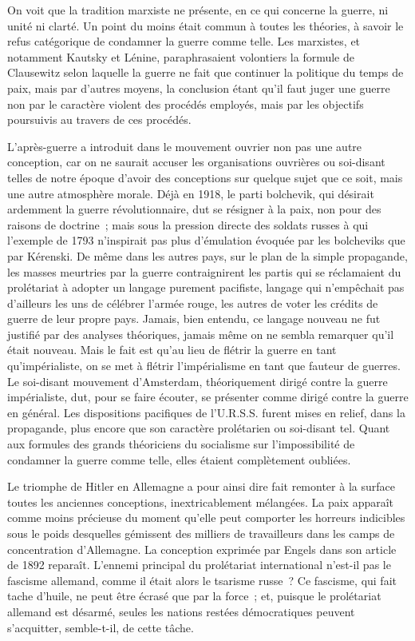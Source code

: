 \documentclass[french,twoside]{book} %
\begin{document}
On voit que la tradition marxiste ne présente, en ce qui concerne la guerre, ni unité ni clarté. Un point du moins était commun à toutes les théories, à savoir le refus catégorique de condamner la guerre comme telle. Les marxis­tes, et notamment Kautsky et Lénine, paraphrasaient volontiers la formule de Clausewitz selon laquelle la guerre ne fait que continuer la politique du temps de paix, mais par d'autres moyens, la conclusion étant qu'il faut juger une guerre non par le caractère violent des procédés employés, mais par les objectifs poursuivis au travers de ces procédés.\par
L'après-guerre a introduit dans le mouvement ouvrier non pas une autre conception, car on ne saurait accuser les organisations ouvrières ou soi-disant telles de notre époque d'avoir des conceptions sur quelque sujet que ce soit, mais une autre atmosphère morale. Déjà en 1918, le parti bolchevik, qui désirait ardemment la guerre révolutionnaire, dut se résigner à la paix, non pour des raisons de doctrine ; mais sous la pression directe des soldats russes à qui l'exemple de 1793 n'inspirait pas plus d'émulation évoquée par les bolcheviks que par Kérenski. De même dans les autres pays, sur le plan de la simple propagande, les masses meurtries par la guerre contraignirent les partis qui se réclamaient du prolétariat à adopter un langage purement pacifiste, langage qui n'empêchait pas d'ailleurs les uns de célébrer l'armée rouge, les autres de voter les crédits de guerre de leur propre pays. Jamais, bien entendu, ce langage nouveau ne fut justifié par des analyses théoriques, jamais même on ne sembla remarquer qu'il était nouveau. Mais le fait est qu'au lieu de flétrir la guerre en tant qu'impérialiste, on se met à flétrir l'impérialisme en tant que fauteur de guerres. Le soi-disant mouvement d'Amsterdam, théoriquement dirigé contre la guerre impérialiste, dut, pour se faire écouter, se présenter comme dirigé contre la guerre en général. Les dispositions pacifiques de l'U.R.S.S. furent mises en relief, dans la propagande, plus encore que son caractère prolétarien ou soi-disant tel. Quant aux formules des grands théori­ciens du socialisme sur l'impossibilité de condamner la guerre comme telle, elles étaient complètement oubliées.\par
Le triomphe de Hitler en Allemagne a pour ainsi dire fait remonter à la surface toutes les anciennes conceptions, inextricablement mélangées. La paix apparaît comme moins précieuse du moment qu'elle peut comporter les horreurs indicibles sous le poids desquelles gémissent des milliers de travail­leurs dans les camps de concentration d'Allemagne. La conception exprimée par Engels dans son article de 1892 reparaît. L'ennemi principal du prolétariat international n'est-il pas le fascisme allemand, comme il était alors le tsarisme russe ? Ce fascisme, qui fait tache d'huile, ne peut être écrasé que par la force ; et, puisque le prolétariat allemand est désarmé, seules les nations restées démocratiques peuvent s'acquitter, semble-t-il, de cette tâche.\par
\end{document}

